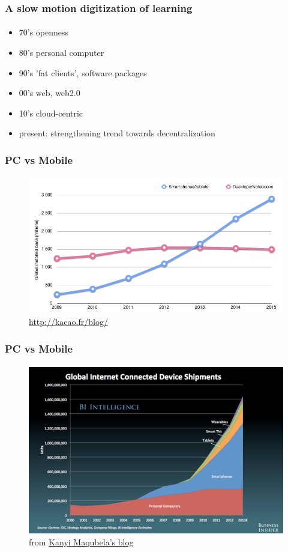 \documentclass{beamer}
\begin{document}
	\begin{frame}
	\frametitle{A slow motion digitization of learning}
	\framesubtitle{}
		\begin{itemize}[<+->]
			\item 70's openness
			\item 80's personal computer
			\item 90's 'fat clients', software packages
			\item 00's web, web2.0
			\item 10's cloud-centric
			\item present: strengthening trend towards decentralization
		\end{itemize}
	\end{frame}

	\begin{frame}
	\frametitle{PC vs Mobile}
	\framesubtitle{}
	        \begin{figure}[h]
                \centering
                \includegraphics[width=.8\textwidth]{./images/mobile_vs_desktop}
		\caption{\url{http://kacao.fr/blog/}}
        	\end{figure}
	\end{frame}

	\begin{frame}
	\frametitle{PC vs Mobile}
	\framesubtitle{}
	        \begin{figure}[h]
                \centering
                \includegraphics[width=.8\textwidth]{./images/globalIOTDeviceShipments}
		\caption{from \href{http://blog.kanyi.me/post/66994307568/contrarian-thinking-mobile-vs-pc-in-emerging}{Kanyi Maqubela's blog}}
        	\end{figure}
	\end{frame}
\end{document}
